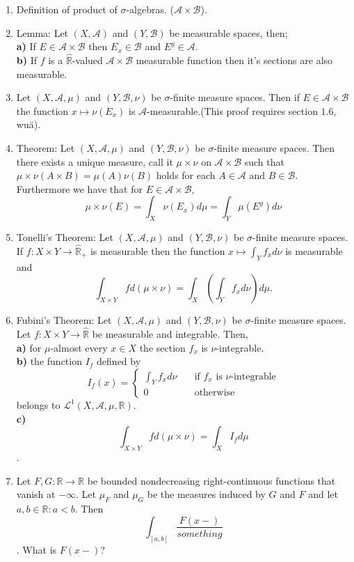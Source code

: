 \documentclass{article}
\begin{document}
\begin{enumerate}
    \section{Del IV}
    \item Definition of product of $\sigma$-algebras. ($\mathscr{A}\times\mathscr{B}$).
    \item Lemma: Let $(X,\mathscr{A})$ and $(Y,\mathscr{B})$ be measurable spaces, then;\\
    \textbf{a) } If $E\in \mathscr{A}\times\mathscr{B}$ then $E_x\in \mathscr{B}$ and $E^y\in \mathscr{A}$.\\
    \textbf{b) } If $f$ is a $\hat{\mathbb{R}}$-valued $\mathscr{A}\times\mathscr{B}$ measurable function then it's sections are also measurable.
    \item Let $(X,\mathscr{A},\mu)$ and $(Y,\mathscr{B},\nu)$ be $\sigma$-finite measure spaces. Then if $E\in \mathscr{A}\times\mathscr{B}$ the function $x\mapsto \nu(E_x)$ is $\mathscr{A}$-measurable.(This proof requires section $1.6$, wuä).
    \item Theorem: Let $(X,\mathscr{A},\mu)$ and $(Y,\mathscr{B},\nu)$ be $\sigma$-finite measure spaces. Then there exists a unique measure, call it $\mu\times\nu$ on $\mathscr{A}\times\mathscr{B}$ such that $\mu\times\nu(A\times B) = \mu(A)\nu(B)$ holds for each $A\in \mathscr{A}$ and $B\in \mathscr{B}$. Furthermore we have that for $E\in \mathscr{A}\times\mathscr{B}$, \[\mu\times\nu(E) = \int_X\nu(E_x)d\mu=\int_Y\mu(E^y)d\nu\]
    \item Tonelli's Theorem: Let $(X,\mathscr{A},\mu)$ and $(Y,\mathscr{B},\nu)$ be $\sigma$-finite measure spaces. If $f: X\times Y \to \hat{\mathbb{R}}_+$ is measurable then the function $x \mapsto \int_Yf_xd\nu$ is measurable and \[\int_{X\times Y}fd(\mu\times \nu) = \int_X\left( \int_Yf_xd\nu\right)d\mu.\]
    \item Fubini's Theorem: Let $(X,\mathscr{A},\mu)$ and $(Y,\mathscr{B},\nu)$ be $\sigma$-finite measure spaces. Let $f: X\times Y \to \hat{\mathbb{R}}$ be measurable and integrable. Then,\\
    \textbf{a) } for $\mu$-almost every $x\in X$ the section $f_x$ is $\nu$-integrable.\\
    \textbf{b) } the function $I_f$ defined by \[I_f(x) = \begin{cases}
        \int_Yf_xd\nu\quad &\text{if $f_x$ is $\nu$-integrable}\\
        0\quad &\text{otherwise}
    \end{cases}\] belongs to $\mathscr{L}^1(X,\mathscr{A},\mu,\mathbb{R})$.\\
    \textbf{c) } \[\int_{X\times Y}fd(\mu\times \nu) = \int _X I_fd\mu\].
    \item Let $F,G:\mathbb{R\to \mathbb{R}}$ be bounded nondecreasing right-continuous functions that vanish at $-\infty$. Let $\mu_F$ and $\mu_G$ be the measures induced by $G$ and $F$ and let $a,b\in \mathbb{R}: a<b$. Then \[\int_{[a,b]}\frac{F(x-)}{something}\]. What is $F(x-)$?\\
    
\end{enumerate}
\end{document}
